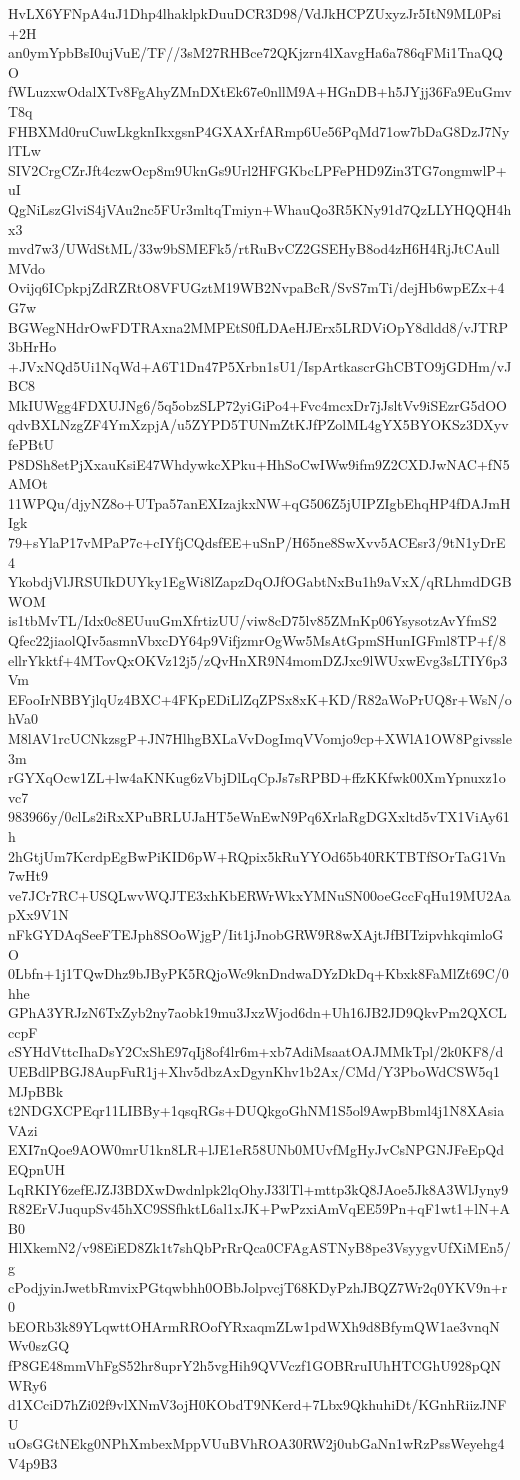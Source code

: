 HvLX6YFNpA4uJ1Dhp4lhaklpkDuuDCR3D98/VdJkHCPZUxyzJr5ItN9ML0Psi+2H
an0ymYpbBsI0ujVuE/TF//3sM27RHBce72QKjzrn4lXavgHa6a786qFMi1TnaQQO
fWLuzxwOdalXTv8FgAhyZMnDXtEk67e0nllM9A+HGnDB+h5JYjj36Fa9EuGmvT8q
FHBXMd0ruCuwLkgknIkxgsnP4GXAXrfARmp6Ue56PqMd71ow7bDaG8DzJ7NylTLw
SIV2CrgCZrJft4czwOcp8m9UknGs9Url2HFGKbcLPFePHD9Zin3TG7ongmwlP+uI
QgNiLszGlviS4jVAu2nc5FUr3mltqTmiyn+WhauQo3R5KNy91d7QzLLYHQQH4hx3
mvd7w3/UWdStML/33w9bSMEFk5/rtRuBvCZ2GSEHyB8od4zH6H4RjJtCAullMVdo
Ovijq6ICpkpjZdRZRtO8VFUGztM19WB2NvpaBcR/SvS7mTi/dejHb6wpEZx+4G7w
BGWegNHdrOwFDTRAxna2MMPEtS0fLDAeHJErx5LRDViOpY8dldd8/vJTRP3bHrHo
+JVxNQd5Ui1NqWd+A6T1Dn47P5Xrbn1sU1/IspArtkascrGhCBTO9jGDHm/vJBC8
MkIUWgg4FDXUJNg6/5q5obzSLP72yiGiPo4+Fvc4mcxDr7jJsltVv9iSEzrG5dOO
qdvBXLNzgZF4YmXzpjA/u5ZYPD5TUNmZtKJfPZolML4gYX5BYOKSz3DXyvfePBtU
P8DSh8etPjXxauKsiE47WhdywkcXPku+HhSoCwIWw9ifm9Z2CXDJwNAC+fN5AMOt
11WPQu/djyNZ8o+UTpa57anEXIzajkxNW+qG506Z5jUIPZIgbEhqHP4fDAJmHIgk
79+sYlaP17vMPaP7c+cIYfjCQdsfEE+uSnP/H65ne8SwXvv5ACEsr3/9tN1yDrE4
YkobdjVlJRSUIkDUYky1EgWi8lZapzDqOJfOGabtNxBu1h9aVxX/qRLhmdDGBWOM
is1tbMvTL/Idx0c8EUuuGmXfrtizUU/viw8cD75lv85ZMnKp06YsysotzAvYfmS2
Qfec22jiaolQIv5asmnVbxcDY64p9VifjzmrOgWw5MsAtGpmSHunIGFml8TP+f/8
ellrYkktf+4MTovQxOKVz12j5/zQvHnXR9N4momDZJxc9lWUxwEvg3sLTIY6p3Vm
EFooIrNBBYjlqUz4BXC+4FKpEDiLlZqZPSx8xK+KD/R82aWoPrUQ8r+WsN/ohVa0
M8lAV1rcUCNkzsgP+JN7HlhgBXLaVvDogImqVVomjo9cp+XWlA1OW8Pgivssle3m
rGYXqOcw1ZL+lw4aKNKug6zVbjDlLqCpJs7sRPBD+ffzKKfwk00XmYpnuxz1ovc7
983966y/0clLs2iRxXPuBRLUJaHT5eWnEwN9Pq6XrlaRgDGXxltd5vTX1ViAy61h
2hGtjUm7KcrdpEgBwPiKID6pW+RQpix5kRuYYOd65b40RKTBTfSOrTaG1Vn7wHt9
ve7JCr7RC+USQLwvWQJTE3xhKbERWrWkxYMNuSN00oeGccFqHu19MU2AapXx9V1N
nFkGYDAqSeeFTEJph8SOoWjgP/Iit1jJnobGRW9R8wXAjtJfBITzipvhkqimloGO
0Lbfn+1j1TQwDhz9bJByPK5RQjoWc9knDndwaDYzDkDq+Kbxk8FaMlZt69C/0hhe
GPhA3YRJzN6TxZyb2ny7aobk19mu3JxzWjod6dn+Uh16JB2JD9QkvPm2QXCLccpF
cSYHdVttcIhaDsY2CxShE97qIj8of4lr6m+xb7AdiMsaatOAJMMkTpl/2k0KF8/d
UEBdlPBGJ8AupFuR1j+Xhv5dbzAxDgynKhv1b2Ax/CMd/Y3PboWdCSW5q1MJpBBk
t2NDGXCPEqr11LIBBy+1qsqRGs+DUQkgoGhNM1S5ol9AwpBbml4j1N8XAsiaVAzi
EXI7nQoe9AOW0mrU1kn8LR+lJE1eR58UNb0MUvfMgHyJvCsNPGNJFeEpQdEQpnUH
LqRKIY6zefEJZJ3BDXwDwdnlpk2lqOhyJ33lTl+mttp3kQ8JAoe5Jk8A3WlJyny9
R82ErVJuqupSv45hXC9SSfhktL6al1xJK+PwPzxiAmVqEE59Pn+qF1wt1+lN+AB0
HlXkemN2/v98EiED8Zk1t7shQbPrRrQca0CFAgASTNyB8pe3VsyygvUfXiMEn5/g
cPodjyinJwetbRmvixPGtqwbhh0OBbJolpvcjT68KDyPzhJBQZ7Wr2q0YKV9n+r0
bEORb3k89YLqwttOHArmRROofYRxaqmZLw1pdWXh9d8BfymQW1ae3vnqNWv0szGQ
fP8GE48mmVhFgS52hr8uprY2h5vgHih9QVVczf1GOBRruIUhHTCGhU928pQNWRy6
d1XCciD7hZi02f9vlXNmV3ojH0KObdT9NKerd+7Lbx9QkhuhiDt/KGnhRiizJNFU
uOsGGtNEkg0NPhXmbexMppVUuBVhROA30RW2j0ubGaNn1wRzPssWeyehg4V4p9B3
